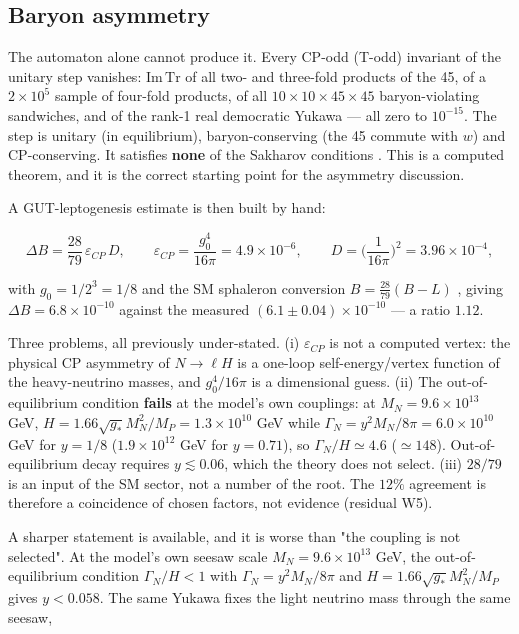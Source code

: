 \documentclass[aps,prd,amsmath,amssymb,superscriptaddress,longbibliography,floatfix,preprint]{revtex4-2}
\begin{document}
\subsection{Baryon asymmetry}

The automaton alone cannot produce it. Every CP-odd (T-odd) invariant of the unitary step vanishes: $\mathrm{Im}\,\allowbreak{}\mathrm{Tr}$ of all two- and three-fold products of the 45, of a $2\times10^5$ sample of four-fold products, of all $10\times10\times45\times45$ baryon-violating sandwiches, and of the rank-1 real democratic Yukawa --- all zero to $10^{-15}$. The step is unitary (in equilibrium), baryon-conserving (the 45 commute with $w$) and CP-conserving. It satisfies \textbf{none} of the Sakharov conditions \cite{ref24}. This is a computed theorem, and it is the correct starting point for the asymmetry discussion.

A GUT-leptogenesis estimate \cite{ref39} is then built by hand:

\[\Delta B = \frac{28}{79}\,\varepsilon_{CP}\,D,\qquad \varepsilon_{CP} = \frac{g_0^4}{16\pi} = 4.9\times10^{-6},\qquad D = \Big(\frac{1}{16\pi}\Big)^2 = 3.96\times10^{-4},\]

with $g_0 = 1/2^3 = 1/8$ and the SM sphaleron conversion $B = \tfrac{28}{79}(B-L)$ \cite{ref25,ref26}, giving $\Delta B = 6.8\times10^{-10}$ against the measured $(6.1\pm0.04)\times10^{-10}$ \cite{ref14} --- a ratio $1.12$.

Three problems, all previously under-stated. (i) $\varepsilon_{CP}$ is not a computed vertex: the physical CP asymmetry of $N\to \ell H$ is a one-loop self-energy/vertex function of the heavy-neutrino masses, and $g_0^4/16\pi$ is a dimensional guess. (ii) The out-of-equilibrium condition \textbf{fails} at the model's own couplings: at $M_N = 9.6\times10^{13}$ GeV, $H = 1.66\sqrt{g_*}M_N^2/M_P = 1.3\times10^{10}$ GeV while $\Gamma_N = y^2 M_N/8\pi = 6.0\times10^{10}$ GeV for $y = 1/8$ ($1.9\times10^{12}$ GeV for $y = 0.71$), so $\Gamma_N/H \simeq 4.6$ ($\simeq 148$). Out-of-equilibrium decay requires $y \lesssim 0.06$, which the theory does not select. (iii) $28/79$ is an input of the SM sector, not a number of the root. The $12\%$ agreement is therefore a coincidence of chosen factors, not evidence (residual W5).

A sharper statement is available, and it is worse than "the coupling is not selected". At the model's own seesaw scale $M_N = 9.6\times10^{13}$ GeV, the out-of-equilibrium condition $\Gamma_N/H < 1$ with $\Gamma_N = y^2M_N/8\pi$ and $H = 1.66\sqrt{g_*}M_N^2/M_P$ gives $y < 0.058$. The same Yukawa fixes the light neutrino mass through the same seesaw,
\end{document}
